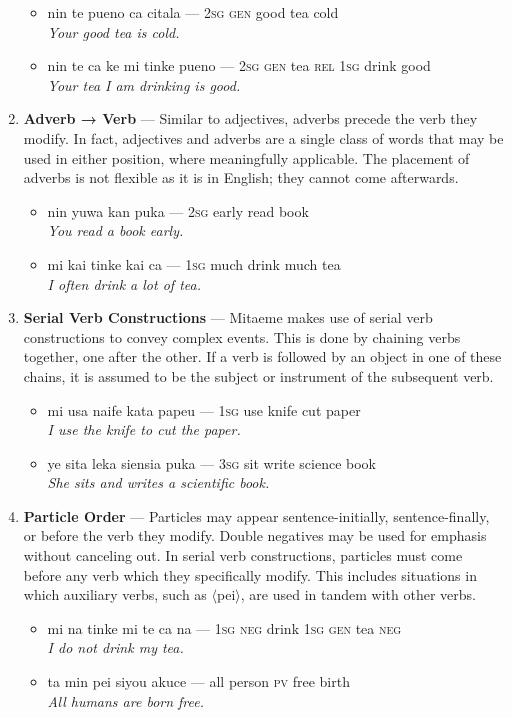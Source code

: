\documentclass[a4paper]{article}
\begin{document}
\begin{enumerate}
	\begin{itemize}
		\item nin te pueno ca citala — \textsc{2sg} \textsc{gen} good tea cold\\\textit{Your good tea is cold.}
		\item nin te ca ke mi tinke pueno — \textsc{2sg gen} tea \textsc{rel 1sg} drink good\\\textit{Your tea I am drinking is good.}
	\end{itemize}
	\item \textbf{Adverb → Verb} — Similar to adjectives, adverbs precede the verb they modify. In fact, adjectives and adverbs are a single class of words that may be used in either position, where meaningfully applicable. The placement of adverbs is not flexible as it is in English; they cannot come afterwards.
	\begin{itemize}
		\item nin yuwa kan puka — \textsc{2sg} early read book\\\textit{You read a book early.}
		\item mi kai tinke kai ca — \textsc{1sg} much drink much tea\\\textit{I often drink a lot of tea.}
	\end{itemize}
	\item \textbf{Serial Verb Constructions} — Mitaeme makes use of serial verb constructions to convey complex events. This is done by chaining verbs together, one after the other. If a verb is followed by an object in one of these chains, it is assumed to be the subject or instrument of the subsequent verb.
	\begin{itemize}
		\item mi usa naife kata papeu — \textsc{1sg} use knife cut paper\\\textit{I use the knife to cut the paper.}
		\item ye sita leka siensia puka — \textsc{3sg} sit write science book\\\textit{She sits and writes a scientific book.}
	\end{itemize}
	\item \textbf{Particle Order} — Particles may appear sentence-initially, sentence-finally, or before the verb they modify. Double negatives may be used for emphasis without canceling out. In serial verb constructions, particles must come before any verb which they specifically modify. This includes situations in which auxiliary verbs, such as $\langle$pei$\rangle$, are used in tandem with other verbs.
	\begin{itemize}
		\item mi na tinke mi te ca na — \textsc{1sg} \textsc{neg} drink \textsc{1sg} \textsc{gen} tea \textsc{neg}\\\textit{I do not drink my tea.}
		\item ta min pei siyou akuce — all person \textsc{pv} free birth\\\textit{All humans are born free.}
	\end{itemize}
\end{enumerate}
\end{document}
